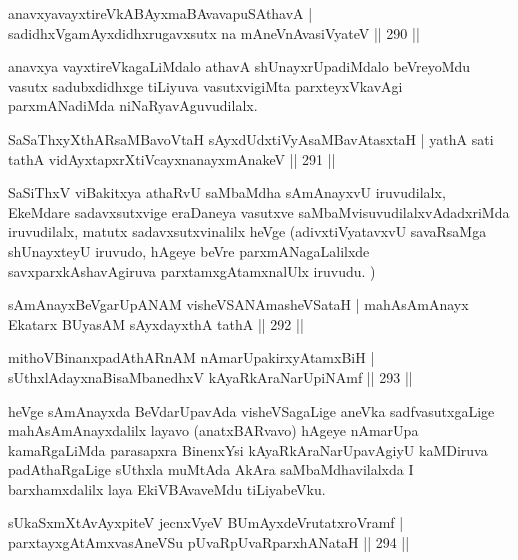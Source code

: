 \begin{shl}
anavxyavayxtireVkABAyxmaBAvavapuSA\s thavA |
sadidhxVgamAyxdidhxrugavxsutx na mAneVnAvasiVyateV \hfill || 290 ||
\end{shl}

\begin{artha}
anavxya vayxtireVkagaLiMdalo athavA shUnayxrUpadiMdalo beVreyoMdu vasutx sadubxdidhxge tiLiyuva vasutxvigiMta parxteyxVkavAgi parxmANadiMda niNaRyavAguvudilalx.
\end{artha}

\begin{shl}
SaSaThxyXthARsaMBavoV\s taH sAyxdUdxtiVyAsaMBavAtasxtaH |
yathA sati tathA vidAyxtapxrXtiVcayxnanayxmAnakeV \hfill || 291 ||
\end{shl}

\begin{artha}
SaSiThxV viBakitxya athaRvU saMbaMdha sAmAnayxvU iruvudilalx, EkeMdare sadavxsutxvige eraDaneya vasutxve saMbaMvisuvudilalxvAdadxriMda iruvudilalx, matutx sadavxsutxvinalilx heVge (adivxtiVyatavxvU savaRsaMga shUnayxteyU iruvudo, hAgeye beVre parxmANagaLalilxde savxparxkAshavAgiruva parxtamxgAtamxnalUlx iruvudu.	)
\end{artha}


\begin{shl}
sAmAnayxBeVgarUpANAM visheVSANAmasheVSataH |
mahAsAmAnayx Ekatarx BUyasAM sAyxdayxthA tathA \hfill || 292 ||
\end{shl}
\begin{shl}
mithoVBinanxpadAthARnAM nAmarUpakirxyAtamxBiH |
sUthxlAdayxnaBisaMbanedhxV kAyaRkAraNarUpiNAmf \hfill || 293 ||
\end{shl}

\begin{artha}
heVge sAmAnayxda BeVdarUpavAda visheVSagaLige aneVka sadfvasutxgaLige mahAsAmAnayxdalilx layavo (anatxBARvavo) hAgeye nAmarUpa kamaRgaLiMda parasapxra BinenxYsi kAyaRkAraNarUpavAgiyU kaMDiruva padAthaRgaLige sUthxla muMtAda AkAra saMbaMdhavilalxda I barxhamxdalilx laya EkiVBAvaveMdu tiLiyabeVku.
\end{artha}


\begin{shl}
sUkaSxmXtAvAyxpiteV jecnxVyeV BUmAyxdeVrutatxroVramf |
parxtayxgAtAmxvasAneVSu pUvaRpUvaRparxhANataH \hfill || 294 ||
\end{shl}

